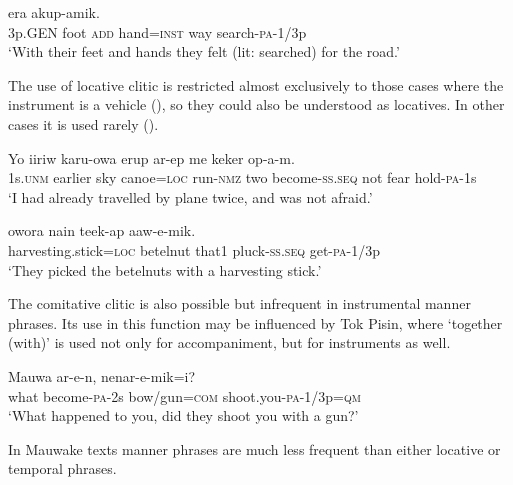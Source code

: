 \ea%
\label{ex:x892}
\gll {}    era akup-amik. \\
   3p.GEN foot \textsc{add} hand=\textsc{inst} way search-\textsc{pa}-1/3p   \\
\glt`With their feet and hands they felt (lit: searched) for the road.'
\z





The use of locative clitic is restricted almost exclusively to those cases where the instrument is a vehicle (), so they could also be understood as locatives. In other cases it is used rarely ().

\ea%
\label{ex:x887}
\gll Yo  iiriw     karu-owa  erup  ar-ep me  keker  op-a-m. \\
 1s.\textsc{unm}  earlier  sky  canoe=\textsc{loc}  run-\textsc{nmz}  two  become-\textsc{ss}.\textsc{seq}  not  fear  hold-\textsc{pa}-1s   \\
\glt`I had already travelled by plane twice, and was not afraid.'
\z









\ea%
\label{ex:x888}
\gll {}  owora  nain  teek-ap  aaw-e-mik. \\
  harvesting.stick=\textsc{loc}  betelnut  that1  pluck-\textsc{ss}.\textsc{seq}  get-\textsc{pa}-1/3p    \\
\glt`They picked the betelnuts with a harvesting stick.'
\z





The comitative clitic is also possible but infrequent in instrumental manner phrases. Its use in this function may be influenced by Tok Pisin, where  `together (with)' is used not only for accompaniment, but for instruments as well.

\ea%
\label{ex:x890}
\gll Mauwa  ar-e-n,    nenar-e-mik=i? \\
 what  become-\textsc{pa}-2s  bow/gun=\textsc{com}  shoot.you-\textsc{pa}-1/3p=\textsc{qm}     \\
\glt`What happened to you, did they shoot you with a gun?'
\z





In Mauwake texts manner phrases are much less frequent than either locative or temporal phrases.

